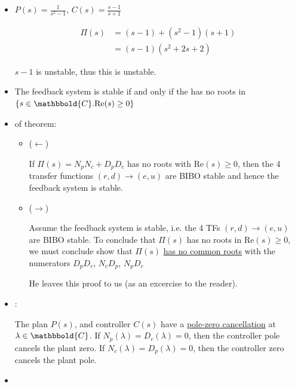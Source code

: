 \begin{enumerate}
            \begin{itemize}
                \item \example $P(s) = \frac{1}{s^2-1}$, $C(s) = \frac{s-1}{s+1}$

                    \begin{align*}
                        \Pi(s) &= (s-1) + (s^2 -1) (s+1) \\
                        &= (s-1)(s^2 + 2s + 2)
                    \end{align*}

                    $s-1$ is unstable, thus this is unstable.

                \item \theorem The feedback system is stable if and only if the \chpm has no roots in $\{ s \in \mathbbold{C}. \text{Re}(s) \ge 0 \}$
                \item \proof of theorem:
                    \begin{itemize}
                        \item ($\leftarrow$)

                            If $\Pi(s) = N_p N_c + D_p D_c$ has no roots with $\text{Re}(s) \ge 0$, then the 4 transfer functions $ (r,d) \to (e,u)$ are BIBO stable and hence the feedback system is stable.

                        \item ($\rightarrow$)

                            Assume the feedback system is stable, i.e. the 4 TFs $(r, d) \to (e, u)$ are BIBO stable.
                            To conclude that $\Pi(s)$ has no roots in $\text{Re}(s) \ge 0$, we must conclude show that $\Pi(s)$ \uline{has no common roots} with the numerators $D_p D_c$, $N_c D_p$, $N_p D_c$

                            He leaves this proof to us (as an excercise to the reader).
                    \end{itemize}
                \item {}:

                    The plan $P(s)$, and controller $C(s)$ have a \uline{pole-zero cancellation} at $\lambda \in \mathbbold{C}$.
                    If $N_p(\lambda) = D_c(\lambda) = 0$, then the controller pole cancels the plant zero.
                    If $N_c(\lambda) = D_p(\lambda) = 0$, then the controller zero cancels the plant pole.
                \item {}


\end{itemize}
\end{enumerate}
